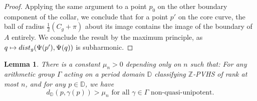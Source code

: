 \documentclass[10pt,letterpaper,english,reqno]{amsart}
\numberwithin{equation}{subsection}
\newcommand\bD{{\mathbb D}}
\newcommand\Z{{\mathbb Z}}
\newtheorem{lemma}[theorem]{Lemma}
\theoremstyle{definition}
\begin{document}
\begin{proof}
Applying the same argument to a point
$p_0$ on the other boundary component of the collar,
we conclude that for a point $p'$ on the core curve,
the ball of radius $\tfrac{1}{2}(C_g+\pi)$ about its 
image contains the image of the boundary of $A$ 
entirely. We conclude the result
by the maximum principle, as $q\mapsto {\rm dist}_g(\Psi(p'),\Psi(q))$
is subharmonic.
\end{proof}

\begin{lemma}\label{bound-away}
There is a constant $\mu_n>0$ depending only on
$n$ such that: For any arithmetic group $\Gamma$ acting on a
period domain $\bD$ classifying $\Z$-PVHS of rank at most $n$,
and for any $p\in \bD$, we have
$$d_\bD(p,\gamma(p))>\mu_n\textrm{ for all }\gamma\in \Gamma\textrm{ non-quasi-unipotent}.$$
\end{lemma}
\end{document}

